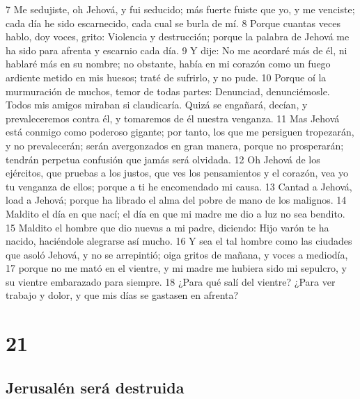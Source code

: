 7 Me sedujiste, oh Jehová, y fui seducido; más fuerte fuiste que yo, y me venciste; cada día he sido escarnecido, cada cual se burla de mí.
8 Porque cuantas veces hablo, doy voces, grito: Violencia y destrucción; porque la palabra de Jehová me ha sido para afrenta y escarnio cada día.
9 Y dije: No me acordaré más de él, ni hablaré más en su nombre; no obstante, había en mi corazón como un fuego ardiente metido en mis huesos; traté de sufrirlo, y no pude.
10 Porque oí la murmuración de muchos, temor de todas partes: Denunciad, denunciémosle. Todos mis amigos miraban si claudicaría. Quizá se engañará, decían, y prevaleceremos contra él, y tomaremos de él nuestra venganza.
11 Mas Jehová está conmigo como poderoso gigante; por tanto, los que me persiguen tropezarán, y no prevalecerán; serán avergonzados en gran manera, porque no prosperarán; tendrán perpetua confusión que jamás será olvidada.
12 Oh Jehová de los ejércitos, que pruebas a los justos, que ves los pensamientos y el corazón, vea yo tu venganza de ellos; porque a ti he encomendado mi causa.
13 Cantad a Jehová, load a Jehová; porque ha librado el alma del pobre de mano de los malignos.
14 Maldito el día en que nací; el día en que mi madre me dio a luz no sea bendito.
15 Maldito el hombre que dio nuevas a mi padre, diciendo: Hijo varón te ha nacido, haciéndole alegrarse así mucho.
16 Y sea el tal hombre como las ciudades que asoló Jehová, y no se arrepintió; oiga gritos de mañana, y voces a mediodía,
17 porque no me mató en el vientre, y mi madre me hubiera sido mi sepulcro, y su vientre embarazado para siempre.
18 ¿Para qué salí del vientre? ¿Para ver trabajo y dolor, y que mis días se gastasen en afrenta?

\chapter{21}

\section*{Jerusalén será destruida}

